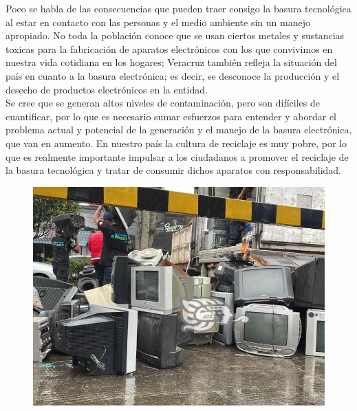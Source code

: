 \documentclass[letterpaper,12pt]{article}
\begin{document}
\begin{sloppypar}
Poco se habla de las consecuencias que pueden traer consigo la basura tecnológica al estar en contacto con las personas y el medio ambiente sin un manejo apropiado. No toda la población conoce que se usan ciertos metales y sustancias toxicas para la fabricación de aparatos electrónicos con los que convivimos en nuestra vida cotidiana en los hogares; Veracruz también refleja la situación del país en cuanto a la basura electrónica; es decir, se desconoce la producción y el desecho de productos electrónicos en la entidad.
\vspace{0.3cm}\\ 
Se cree que se generan altos niveles de contaminación, pero son difíciles de cuantificar, por lo que es necesario sumar esfuerzos para entender y abordar el problema actual y potencial de la generación y el manejo de la basura electrónica, que van en aumento. En nuestro país la cultura de reciclaje es muy pobre, por lo que es realmente importante impulsar a los ciudadanos a promover el reciclaje de la basura tecnológica y tratar de consumir dichos aparatos con responsabilidad.
\begin{figure}[H]
    \centering 
    \includegraphics[width = 0.8 \linewidth]{basura.jpg}
\end{figure}

\newpage

\end{sloppypar}
\end{document}
